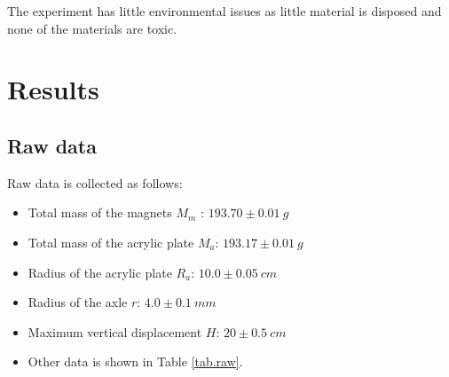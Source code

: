 \documentclass[a4paper]{article}
\begin{document}
The experiment has little environmental issues as little material is disposed and none of the materials are toxic.

\section{Results}
\label{sec.results}

\subsection{Raw data}

Raw data is collected as follows:

\begin{itemize}
    \item Total mass of the magnets $M_m$ : $193.70\pm0.01\SI{}{g}$
    \item Total mass of the acrylic plate $M_a$: $193.17\pm0.01\SI{}{g}$
    \item Radius of the acrylic plate $R_a$: $10.0\pm0.05\SI{}{cm}$
    \item Radius of the axle $r$: $4.0\pm0.1\SI{}{mm}$
    \item Maximum vertical displacement $H$: $20\pm0.5\SI{}{cm}$
    \item Other data is shown in Table \ref{tab.raw}.
\end{itemize}
\end{document}
